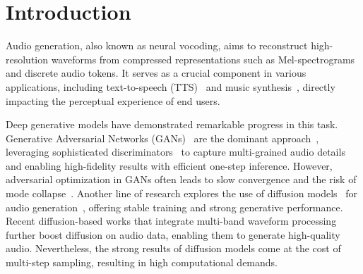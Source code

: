 \documentclass{article} %
\begin{document}
\section{Introduction}
\vspace{-0.8em}

Audio generation, also known as neural vocoding, aims to reconstruct high-resolution waveforms from compressed representations such as Mel-spectrograms and discrete audio tokens. It serves as a crucial component in various applications, including text-to-speech (TTS)~\citep{neural_tts,vits,zipvoice} and music synthesis~\citep{neural_audio_synth,adversarial_audio_synth,gansynth}, directly impacting the perceptual experience of end users.

Deep generative models have demonstrated remarkable progress in this task. 
Generative Adversarial Networks (GANs)~\citep{gan,wgan} are the dominant approach~\citep{melgan,hifigan,bigvgan,vocos}, leveraging sophisticated discriminators~\citep{melgan, hifigan,mrd,multi-subband-gan} to capture multi-grained audio details and enabling high-fidelity results with efficient one-step inference. However, adversarial optimization in GANs often leads to slow convergence and the risk of mode collapse~\citep{gan_collapse}. Another line of research explores the use of diffusion models~\citep{difussion_2015,ddpm,ddim} for audio generation~\citep{diffwave,Wavegrad,priorgrad,fregrad}, offering stable training and strong generative performance. 
Recent diffusion-based works that integrate multi-band waveform processing~\citep{mbd, rfwave} further boost diffusion on audio data, enabling them to generate high-quality audio.
Nevertheless, the strong results of diffusion models come at the cost of multi-step sampling, resulting in high computational demands. 
\end{document}
